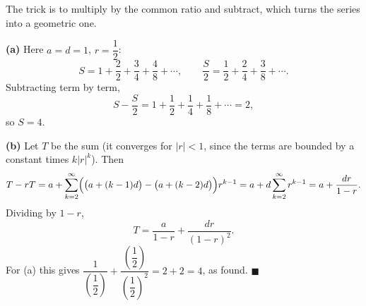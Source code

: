 The trick is to multiply by the common ratio and subtract, which turns the series into a geometric one.

\textbf{(a)} Here $a=d=1$, $r=\dfrac{1}{2}$:
\[S=1+\dfrac{2}{2}+\dfrac{3}{4}+\dfrac{4}{8}+\cdots,\qquad\dfrac {S}{2}=\dfrac{1}{2}+\dfrac{2}{4}+\dfrac{3}{8}+\cdots .\]
Subtracting term by term,
\[S-\dfrac {S}{2}=1+\dfrac{1}{2}+\dfrac{1}{4}+\dfrac{1}{8}+\cdots=2,\]
so $S=\boxed{4}$.

\textbf{(b)} Let $T$ be the sum (it converges for $|r|<1$, since the terms are bounded by a constant times $k|r|^{k}$). Then
\[T-rT=a+\sum_{k=2}^{\infty}\Bigl(\bigl(a+(k-1)d\bigr)-\bigl(a+(k-2)d\bigr)\Bigr)r^{k-1}=a+d\sum_{k=2}^{\infty}r^{k-1}=a+\dfrac{dr}{1-r}.\]
Dividing by $1-r$,
\[T=\dfrac{a}{1-r}+\dfrac{dr}{(1-r)^2}.\]
For (a) this gives $\dfrac{1}{\left(\dfrac{1}{2}\right)}+\dfrac{\left(\dfrac{1}{2}\right)}{\left(\dfrac{1}{2}\right)^2}=2+2=4$, as found. $\blacksquare$
